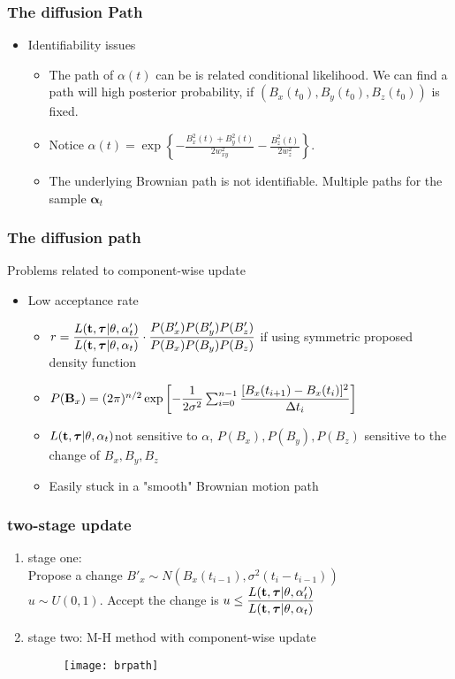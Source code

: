 \documentclass[11pt]{beamer}
\newcommand{\bit}{\begin{itemize}\setlength{\itemsep}{0cm}\setlength{\topsep}{0cm}}
\newcommand{\eit}{\end{itemize}}
\newcommand{\benum}{\begin{enumerate}\setlength{\itemsep}{0cm}\setlength{\parsep
}{0cm}}
\newcommand{\eenum}{\end{enumerate}}
\newcommand{\bB}{{\bf B}}
\newcommand{\balpha}{\boldsymbol{\alpha}}
\newcommand{\btau}{{\boldsymbol{\tau}}}
\newcommand{\bt}{{\bf t}}
\begin{document}
\begin{frame}
	\frametitle{The diffusion Path}
	\bit
	\item Identifiability issues
	\bit
	\item The path of $\alpha(t)$ can be is related conditional likelihood. We can find a path will high posterior probability, if $(B_x(t_0),B_y(t_0),B_z(t_0))$ is fixed. 
	\item Notice $\alpha(t)=\exp\left\{-\frac{B^2_x(t)+B^2_y(t)}{2w^2_{xy}}-\frac{B^2_z(t)}{2w_z^2}\right\}$. 
	\item The underlying Brownian path is not identifiable. Multiple paths for the sample $\balpha_t$
	\eit
	\eit
\end{frame}
\begin{frame}
\frametitle{The diffusion path}
Problems related to component-wise update
\bit
\item Low acceptance rate  
	\bit
	\item $r=\dfrac{L(\bt,\btau|\theta,\alpha'_t)}{L(\bt,\btau|\theta,\alpha_t)}\cdot\dfrac{P(B'_x)P(B'_y)P(B'_z)}{P(B_x)P(B_y)P(B_z)}$ if using symmetric proposed density function
	\item 	$P(\bB_x)=(2\pi)^{n/2}\exp\left[-\dfrac{1}{2\sigma^2}\sum_{i=0}^{n-1}\dfrac {[B_x(t_{i+1})-B_x(t_i)]^2}{\Delta t_i}\right]$
	\item $L(\bt,\btau|\theta,\alpha_t)$not sensitive to $\alpha$, $P(B_x),P(B_y),P(B_z)$ sensitive to the change of $B_x,B_y,B_z$
	\item Easily stuck in a "smooth" Brownian motion path
	\eit
	\eit


\end{frame}

\begin{frame}
\frametitle{two-stage update}
\benum
\item stage one:\\ 
Propose a change $B'_x\sim N\left(B_x(t_{i-1}),\sigma^2(t_i-t_{i-1})\right)$\\
$u\sim U(0,1)$. Accept the change is $u\leq \dfrac{L(\bt,\btau|\theta,\alpha'_t)}{L(\bt,\btau|\theta,\alpha_t)}$
\item stage two: M-H method with component-wise update

\begin{figure}
\centering
\texttt{[image: brpath]}
\end{figure}
\eenum
\end{frame}
\end{document}
